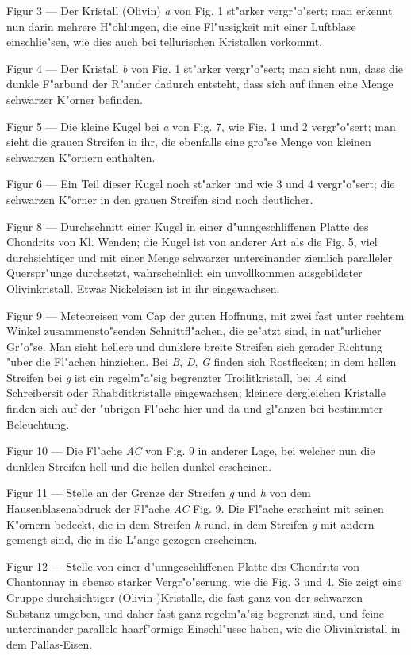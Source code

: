 \documentclass[a4paper, 11pt, oneside]{article}
\begin{document}
Figur 3 --- Der Kristall (Olivin) \emph{a} von Fig. 1 st"arker vergr"o"sert; man erkennt nun darin mehrere H"ohlungen, die eine Fl"ussigkeit mit einer Luftblase einschlie"sen, wie dies auch bei tellurischen Kristallen vorkommt.

Figur 4 --- Der Kristall \emph{b} von Fig. 1 st"arker vergr"o"sert; man sieht nun, dass die dunkle F"arbund der R"ander dadurch entsteht, dass sich auf ihnen eine Menge schwarzer K"orner befinden.

Figur 5 --- Die kleine Kugel bei \emph{a} von Fig. 7, wie Fig. 1 und 2 vergr"o"sert; man sieht die grauen Streifen in ihr, die ebenfalls eine gro"se Menge von kleinen schwarzen K"ornern enthalten.

Figur 6 --- Ein Teil dieser Kugel noch st"arker und wie 3 und 4 vergr"o"sert; die schwarzen K"orner in den grauen Streifen sind noch deutlicher.

Figur 8 --- Durchschnitt einer Kugel in einer d"unngeschliffenen Platte des Chondrits von Kl. Wenden; die Kugel ist von anderer Art als die Fig. 5, viel durchsichtiger und mit einer Menge schwarzer untereinander ziemlich paralleler Querspr"unge durchsetzt, wahrscheinlich ein unvollkommen ausgebildeter Olivinkristall. Etwas Nickeleisen ist in ihr eingewachsen.

Figur 9 --- Meteoreisen vom Cap der guten Hoffnung, mit zwei fast unter rechtem Winkel zusammensto"senden Schnittfl"achen, die ge"atzt sind, in nat"urlicher Gr"o"se. Man sieht hellere und dunklere breite Streifen sich gerader Richtung "uber die Fl"achen hinziehen. Bei \emph{B}, \emph{D}, \emph{G} finden sich Rostflecken; in dem hellen Streifen bei \emph{g} ist ein regelm"a"sig begrenzter Troilitkristall, bei \emph{A} sind Schreibersit oder Rhabditkristalle eingewachsen; kleinere dergleichen Kristalle finden sich auf der "ubrigen Fl"ache hier und da und gl"anzen bei bestimmter Beleuchtung.

Figur 10 --- Die Fl"ache \emph{AC} von Fig. 9 in anderer Lage, bei welcher nun die dunklen Streifen hell und die hellen dunkel erscheinen.

Figur 11 --- Stelle an der Grenze der Streifen \emph{g} und \emph{h} von dem Hausenblasenabdruck der Fl"ache \emph{AC} Fig. 9. Die Fl"ache erscheint mit seinen K"ornern bedeckt, die in dem Streifen \emph{h} rund, in dem Streifen \emph{g} mit andern gemengt sind, die in die L"ange gezogen erscheinen.

Figur 12 --- Stelle von einer d"unngeschliffenen Platte des Chondrits von Chantonnay in ebenso starker Vergr"o"serung, wie die Fig. 3 und 4. Sie zeigt eine Gruppe durchsichtiger (Olivin-)Kristalle, die fast ganz von der schwarzen Substanz umgeben, und daher fast ganz regelm"a"sig begrenzt sind, und feine untereinander parallele haarf"ormige Einschl"usse haben, wie die Olivinkristall in dem Pallas-Eisen.
\end{document}

